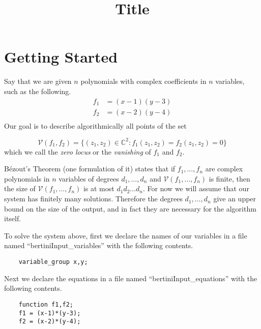 \documentclass[12pt]{article}
\title{\large \bf
Title
}
\author{}
\newcommand{\C}{\mathbb{C}}
\begin{document}
\maketitle
\section{Getting Started}
Say that we are given $n$ polynomials
with complex coefficients 
in $n$ variables, such as the 
following. 
\begin{align*}
    f_1 &= (x-1)(y-3)\\
    f_2 &= (x-2)(y-4)\\
\end{align*}
Our goal is to describe algorithmically all points of the set 

\[
    \mathcal{V}(f_1, f_2) = \{(z_1,z_2) \in \C^2 : f_1(z_1, z_2) = 
    f_2(z_1, z_2) = 0\}
\]
which we call the \emph{zero locus} or the \emph{vanishing} of $f_1$ and 
$f_2$. 

B\'{e}zout's Theorem (one formulation of it) states that if 
$f_1, \ldots, f_n$ are complex polynomials
 in $n$ variables of degrees 
$d_1, \ldots, d_n$ and $\mathcal{V}(f_1, \ldots, f_n)$ is finite, then 
the size of $\mathcal{V}(f_1, \ldots, f_n)$ is at most $d_1d_2 \ldots d_n$. 
For now we will assume that our system has finitely many solutions.
Therefore the degrees $d_1, \ldots, d_n$ give an upper bound on the size 
of the output, and in fact they are necessary for the algorithm itself.

To solve the system above, first we declare the names of our variables 
in a file named ``bertiniInput\_variables'' with the following contents.

\begin{lstlisting}
    variable_group x,y; 
\end{lstlisting}


Next we declare the equations in a file named ``bertiniInput\_equations'' 
with the following contents.

\begin{lstlisting}
    function f1,f2;
    f1 = (x-1)*(y-3);
    f2 = (x-2)*(y-4);
\end{lstlisting}

\end{document}
